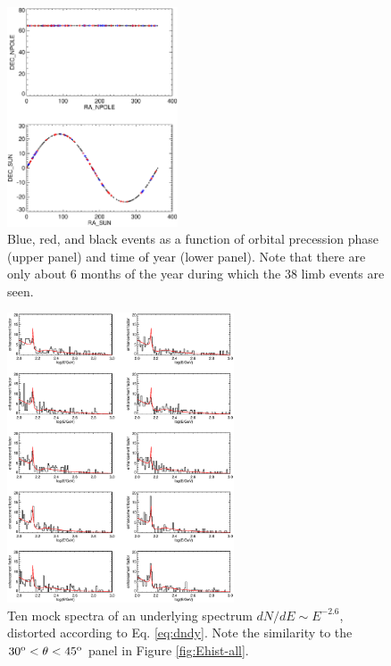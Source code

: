 \documentclass[aps,twocolumn,prd,superscriptaddress,showpacs,nofootinbib,fixfloat]{revtex4}
\newcommand{\degree}{^{\rm o}}
\begin{document}
\begin{figure}[p]
\centering
\includegraphics[width=0.45\textwidth]{plots/sun.ps}
\caption{Blue, red, and black events as a function of orbital precession phase
  (upper panel) and time of year (lower panel).  Note that there are only
  about 6 months of the year during which the 38 limb events are seen. 
}
\label{fig:sun}
\end{figure}

\begin{figure}[p]
  \centering
  \includegraphics[width=0.6\textwidth]{plots/limb_bump_model_many.ps}
  \caption{Ten mock spectra of an underlying spectrum $dN/dE \sim E^{-2.6}$,
  distorted according to Eq. \ref{eq:dndy}.  Note the similarity to the
  $30\degree < \theta < 45\degree$ panel in Figure \ref{fig:Ehist-all}.  }
  \label{fig:bumpmodelmany}
\end{figure}
 
\end{document}
